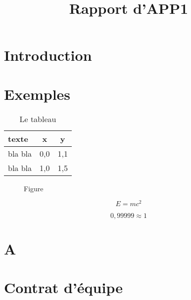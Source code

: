 \documentclass[livre]{udes-genie-simple}
\title{Rapport d'APP1}
\begin{document}



{
    \linespread{0,8}
    \tableofcontents
}

\listoffigures
\listoftables

\clearpage


\section{Introduction}

\section{Exemples}

\begin{table}[h!]
    \begin{center}
        \caption{Le tableau}
        \label{lelabeldutableau}
        \begin{tabular}{|p{3cm}|c|c|}
            \hline
            texte & \textbf{x} & \textbf{y} \\ 
            \hline
            \hline
            bla bla & 0,0 & 1,1\\
            bla bla & 1,0 & 1,5\\
            \hline
        \end{tabular}
    \end{center}
\end{table}

\begin{figure}[h!]
    \centering
    \caption{Figure}
    \label{lelabeldelafigure}
\end{figure}

\begin{equation}
    E = m c ^ 2
\end{equation}

\begin{equation}
    0,99999 \approx 1
\end{equation}

\section{A}
\section{Contrat d'équipe}
\end{document}
